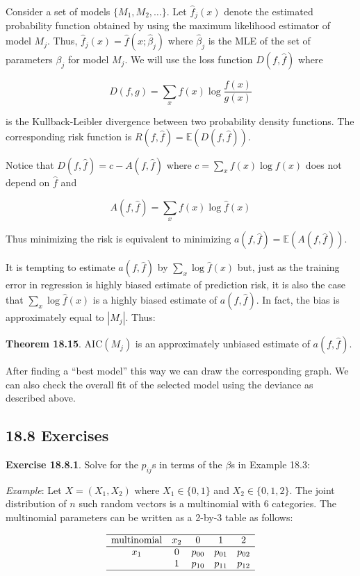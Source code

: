 Consider a set of models \(\{ M_{1}, M_{2}, \dots \}\). Let \(\hat{f}_{j}(x)\) denote the estimated probability function obtained by using the maximum likelihood estimator of model \(M_{j}\). Thus, \(\hat{f}_{j}(x) = \hat{f}(x; \hat{\beta}_{j})\) where \(\hat{\beta}_{j}\) is the MLE of the set of parameters \(\beta_{j}\) for model \(M_{j}\). We will use the loss function \(D(f, \hat{f})\) where

\[ D(f, g) = \sum_x f(x) \log \frac{f(x)}{g(x)} \]

is the Kullback-Leibler divergence between two probability density functions. The corresponding risk function is \(R(f, \hat{f}) = \mathbb{E}(D(f, \hat{f}))\).

Notice that \(D(f, \hat{f}) = c - A(f, \hat{f})\) where \(c = \sum_x f(x) \log f(x)\) does not depend on \(\hat{f}\) and

\[ A(f, \hat{f}) = \sum_x f(x) \log \hat{f}(x) \]

Thus minimizing the risk is equivalent to minimizing \(a(f, \hat{f}) = \mathbb{E}(A(f, \hat{f}))\).

It is tempting to estimate \(a(f, \hat{f})\) by \(\sum_x \log \hat{f}(x)\) but, just as the training error in regression is highly biased estimate of prediction risk, it is also the case that \(\sum_x \log \hat{f}(x)\) is a highly biased estimate of \(a(f, \hat{f})\). In fact, the bias is approximately equal to \(|M_{j}|\). Thus:

\textbf{Theorem 18.15}. \(\text{AIC}(M_{j})\) is an approximately unbiased estimate of \(a(f, \hat{f})\).

After finding a ``best model'' this way we can draw the corresponding graph. We can also check the overall fit of the selected model using the deviance as described above.

\subsection*{18.8 Exercises}

\textbf{Exercise 18.8.1}. Solve for the \(p_{ij}\)s in terms of the \(\beta\)s in Example 18.3:

\emph{Example}: Let \(X = (X_{1}, X_{2})\) where \(X_{1} \in \{0, 1\}\) and \(X_{2} \in \{ 0, 1, 2 \}\). The joint distribution of \(n\) such random vectors is a multinomial with 6 categories. The multinomial parameters can be written as a 2-by-3 table as follows:

\[
\begin{array}{ccccc}
\hline
\text{multinomial} & x_{2} & 0 & 1 & 2 \\
\hline
x_{1} & 0 & p_{00} & p_{01} & p_{02} \\
    & 1 & p_{10} & p_{11} & p_{12} \\
\hline
\end{array}
\]

